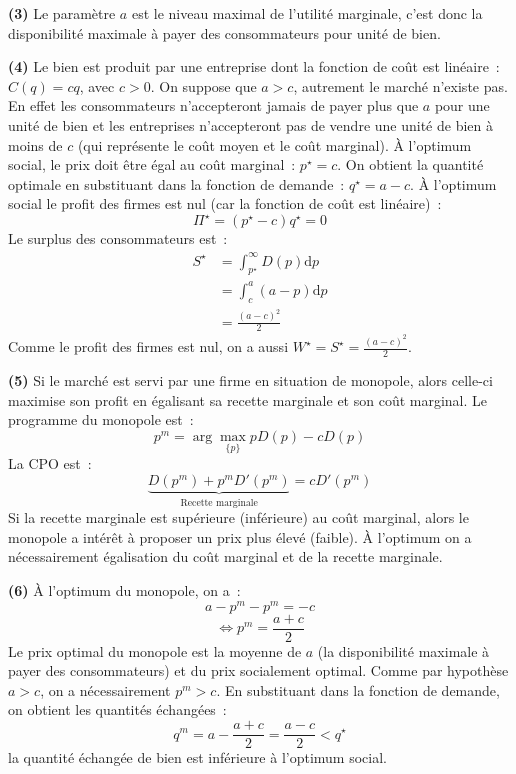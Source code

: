 \documentclass[10pt,a4paper,notitlepage,twocolumn]{article}
\newcommand{\question}[1]{\textbf{(#1)}}
\begin{document}
\question{3} Le paramètre $a$ est le niveau maximal de l'utilité marginale, c'est donc la disponibilité maximale à payer des consommateurs pour unité de bien.\newline

\question{4} Le bien est produit par une entreprise dont la fonction
de coût est linéaire~: $C(q) = c q$, avec $c>0$. On suppose que $a>c$, autrement le marché n'existe pas. En effet les consommateurs n'accepteront jamais de payer plus que $a$ pour une unité de bien et les entreprises n'accepteront pas de vendre une unité de bien à moins de $c$ (qui représente le coût moyen et le coût marginal). À l'optimum social, le prix doit être égal au coût marginal~: $p^\star = c$. On obtient la quantité optimale en substituant dans la fonction de demande~: $q^\star = a-c$. À l'optimum social le profit des firmes est nul (car la fonction de coût est linéaire)~:
\[
\Pi^\star = (p^\star-c)q^\star = 0
\]
Le surplus des consommateurs est~:
\[
  \begin{split}
    S^\star &= \int_{p^{\star}}^\infty D(p)\mathrm dp\\
            &= \int_{c}^a (a-p)\mathrm dp\\
            &= \frac{(a-c)^2}{2}
  \end{split}
\]
Comme le profit des firmes est nul, on a aussi $W^\star=S^\star=\frac{(a-c)^2}{2}$.\newline

\question{5} Si le marché est servi par une firme en situation de monopole, alors celle-ci maximise son profit en égalisant sa recette marginale et son coût marginal. Le programme du monopole est~:
\[
p^m = \arg\max_{\{p\}} p D(p) - cD(p)
\]
La CPO est~:
\[
\underbrace{D(p^m)+p^m D'(p^m)}_{\text{Recette marginale}} = cD'(p^m)
\]
Si la recette marginale est supérieure (inférieure) au coût marginal,
alors le monopole a intérêt à proposer un prix plus élevé (faible). À
l'optimum on a nécessairement égalisation du coût marginal et de la
recette marginale.\newline

\question{6} À l'optimum du monopole, on a~:
\[
a-p^m - p^m = -c
\]
\[
\Leftrightarrow p^m = \frac{a+c}{2}
\]
Le prix optimal du monopole est la moyenne de $a$ (la disponibilité maximale à payer des consommateurs) et du prix socialement optimal. Comme par hypothèse $a>c$, on a nécessairement $p^m>c$. En substituant dans la fonction de demande, on obtient les quantités échangées~:
\[
q^m = a - \frac{a+c}{2} = \frac{a-c}{2}< q^\star
\]
la quantité échangée de bien est inférieure à l'optimum social.\newline
\end{document}
